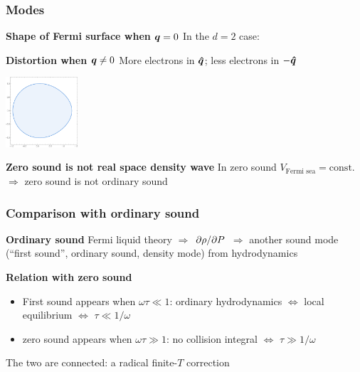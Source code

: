 \documentclass{beamer}
\begin{document}
\begin{frame}
\frametitle{Modes}

\textbf{Shape of Fermi surface when $\vb*{q} = 0$} In the $d=2$ case:

\begin{center}
    
\end{center}

\textbf{Distortion when $\vb*{q} \neq 0$} More electrons in $\vu*{q}$; less electrons in $- \vu*{q}$

\begin{center}
    \includegraphics[width=0.2\textwidth]{spatial/zero-sound-l-0.png}
\end{center}

\textbf{Zero sound is not real space density wave} In zero sound $V_{\text{Fermi sea}} = \text{const}.$
$\Rightarrow$ zero sound is not ordinary sound

\end{frame}

\begin{frame}
\frametitle{Comparison with ordinary sound}

\textbf{Ordinary sound} Fermi liquid theory $\Rightarrow$ $\pdv*{\rho}{P}$ $\Rightarrow$
another sound mode (``first sound'', ordinary sound, density mode) from hydrodynamics

\vspace{0.5cm}

\textbf{Relation with zero sound} 
\begin{itemize}
    \item First sound appears when $\omega \tau \ll 1$:
    ordinary hydrodynamics $\Leftrightarrow$ local equilibrium $\Leftrightarrow$ $\tau \ll 1 / \omega$
    \item zero sound appears when $\omega \tau \gg 1$: 
    no collision integral $\Leftrightarrow$ $\tau \gg 1 / \omega$
\end{itemize}

The two are connected: a radical finite-$T$ correction

\begin{center}
    
\end{center}    

\end{frame}
\end{document}
